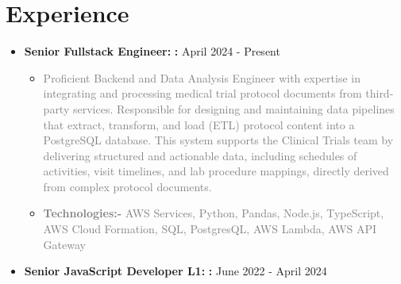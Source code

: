 \documentclass[letterpaper,11pt]{article}
\begin{document}
\section{Experience}
\begin{itemize}[left=0pt,itemsep=-10pt]
    \item \textbf{Senior Fullstack Engineer: } \textbf{:}\href{https://bct-consulting.com/}{} \hfill {April 2024 - Present}
    \begin{itemize}[left=10pt, itemsep=-3pt]
    \vspace{-5pt}
    \item \textcolor{gray}{Proficient Backend and Data Analysis Engineer with expertise in integrating and processing medical trial protocol documents from third-party services. Responsible for designing and maintaining data pipelines that extract, transform, and load (ETL) protocol content into a PostgreSQL database. This system supports the Clinical Trials team by delivering structured and actionable data, including schedules of activities, visit timelines, and lab procedure mappings, directly derived from complex protocol documents.}
    \item  \textcolor{gray}{ \textbf{Technologies:-} AWS Services, Python, Pandas, Node.js, TypeScript, AWS Cloud Formation, SQL, PostgresQL, AWS Lambda, AWS API Gateway}
\end{itemize}
\end{itemize}

\begin{itemize}[left=0pt,itemsep=-10pt]
 \item \textbf{Senior JavaScript Developer L1: }
 \textbf{:}\href{https://www.materialplus.io/srijan-is-now-material/}{} \hfill {June 2022 - April 2024}
\end{itemize}
\end{document}
